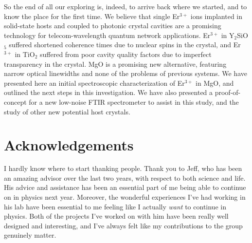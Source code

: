 \documentclass[12pt]{report}
\newcommand{\erbium}[1][ ]{Er$^{3+}$#1}
\newcommand{\YSO}[1][ ]{Y$_{2}$SiO$_{5}$#1}
\newcommand{\TiO}[1][ ]{TiO$_{2}$#1}
\renewcommand{\bibname}{References}
\begin{document}
So the end of all our exploring is, indeed, to arrive back where we started, and to know the place for the first time. We believe that single \erbium ions implanted in solid-state hosts and coupled to photonic crystal cavities are a promising technology for telecom-wavelength quantum network applications. \erbium in \YSO suffered shortened coherence times due to nuclear spins in the crystal, and \erbium in \TiO suffered from poor cavity quality factors due to imperfect transparency in the crystal. MgO is a promising new alternative, featuring narrow optical linewidths and none of the problems of previous systems. We have presented here an initial spectroscopic characterization of \erbium in MgO, and outlined the next steps in this investigation. We have also presented a proof-of-concept for a new low-noise FTIR spectrometer to assist in this study, and the study of other new potential host crystals.



\renewcommand{\bibname}{References}
\singlespacing

\cleardoublepage
\ifdefined{}
\else
\fi
{}


\clearpage
\newpage
{}
\fancyhead{}
\chapter*{Acknowledgements}
\doublespacing
I hardly know where to start thanking people. Thank you to Jeff, who has been an amazing advisor over the last two years, with respect to both science and life. His advice and assistance has been an essential part of me being able to continue on in physics next year. Moreover, the wonderful experiences I've had working in his lab have been essential to me feeling like I actually \emph{want} to continue in physics. Both of the projects I've worked on with him have been really well designed and interesting, and I've always felt like my contributions to the group genuinely matter.
\end{document}
